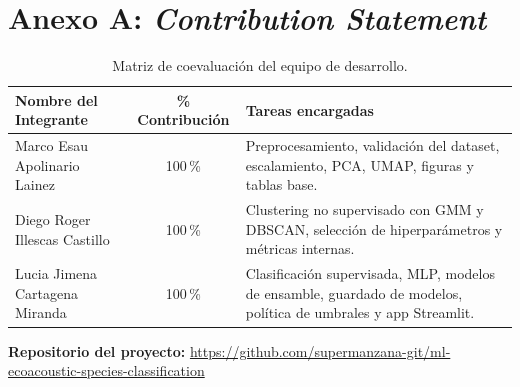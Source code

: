 \documentclass[10pt,a4paper]{article}
\begin{document}
\appendix
\section*{Anexo A: \textit{Contribution Statement}}
\begin{table}[H]
\centering
\caption{Matriz de coevaluaci\'on del equipo de desarrollo.}
\label{tab:coev}
\small
\begin{tabular}{p{4.8cm}cp{7cm}}
\toprule
\textbf{Nombre del Integrante} & \textbf{\% Contribuci\'on} & \textbf{Tareas encargadas} \\
\midrule
Marco Esau Apolinario Lainez & 100\,\% & Preprocesamiento, validaci\'on del dataset, escalamiento, PCA, UMAP, figuras y tablas base. \\
Diego Roger Illescas Castillo & 100\,\% & Clustering no supervisado con GMM y DBSCAN, selecci\'on de hiperpar\'ametros y m\'etricas internas. \\
Lucia Jimena Cartagena Miranda & 100\,\% & Clasificaci\'on supervisada, MLP, modelos de ensamble, guardado de modelos, pol\'itica de umbrales y app Streamlit. \\
\bottomrule
\end{tabular}
\end{table}

\vspace{0.5em}
\textbf{Repositorio del proyecto:} \url{https://github.com/supermanzana-git/ml-ecoacoustic-species-classification}
\end{document}
